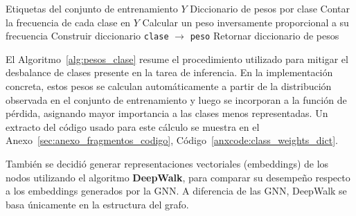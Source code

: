 

\begin{algorithm}[H]
\caption{Cálculo de pesos por clase para balanceo}
\label{alg:pesos_clase}
\begin{algorithmic}[1]
\Require Etiquetas del conjunto de entrenamiento $Y$
\Ensure Diccionario de pesos por clase
\State Contar la frecuencia de cada clase en $Y$
    \State Calcular un peso inversamente proporcional a su frecuencia
\EndFor
\State Construir diccionario \texttt{clase} $\rightarrow$ \texttt{peso}
\State Retornar diccionario de pesos
\end{algorithmic}
\end{algorithm}

El Algoritmo~\ref{alg:pesos_clase} resume el procedimiento utilizado para mitigar el desbalance de clases presente en la tarea de inferencia. En la implementación concreta, estos pesos se calculan automáticamente a partir de la distribución observada en el conjunto de entrenamiento y luego se incorporan a la función de pérdida, asignando mayor importancia a las clases menos representadas. Un extracto del código usado para este cálculo se muestra en el Anexo~\ref{sec:anexo_fragmentos_codigo}, Código~\ref{anxcode:class_weights_dict}.



También se decidió generar representaciones vectoriales (embeddings) de los nodos utilizando el algoritmo \textbf{DeepWalk}, para comparar su desempeño respecto a los embeddings generados por la GNN. A diferencia de las GNN, DeepWalk se basa únicamente en la estructura del grafo.\\




